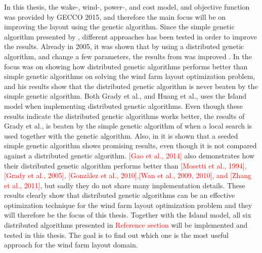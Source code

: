 \noindent In this thesis, the wake-, wind-, power-, and cost model, and objective function was provided by GECCO 2015, and therefore the main focus will be on improving the layout using the genetic algorithm. Since the simple genetic algorithm presented by \citep{Mosetti}, different approaches has been tested in order to improve the results. Already in 2005, it was shown that by using a distributed genetic algorithm, and change a few parameters, the results from \citep{Mosetti} was improved \citep{Grady}. In \citep{Huang} the focus was on showing how distributed genetic algorithms performs better than simple genetic algorithms on solving the wind farm layout optimization problem, and his results show that the distributed genetic algorithm is never beaten by the simple genetic algorithm. Both Grady et al., and Huang et al., uses the Island model when implementing distributed genetic algorithms. Even though these results indicate the distributed genetic algorithms works better, the results of Grady et al., is beaten by the simple genetic algorithm of \cite{Gonzales} when a local search is used together with the genetic algorithm. Also, in \citep{Saavedra-Morena} it is shown that a seeded simple genetic algorithm shows promising results, even though it is not compared against a distributed genetic algorithm. \textcolor{red}{[Gao et al., 2014]} also demonstrates how their distributed genetic algorithm performs better than \textcolor{red}{[Mosetti et al., 1994], [Grady et al., 2005], [Gonzàlez et al., 2010],[Wan et al., 2009, 2010], and [Zhang et al., 2011]}, but sadly they do not share many implementation details. These results clearly show that distributed genetic algorithms can be an effective optimization technique for the wind farm layout optimization problem and they will therefore be the focus of this thesis. Together with the Island model, all six distributed algorithms presented in \textcolor{red}{Reference section} will be implemented and tested in this thesis. The goal is to find out which one is the most useful approach for the wind farm layout domain. \\


